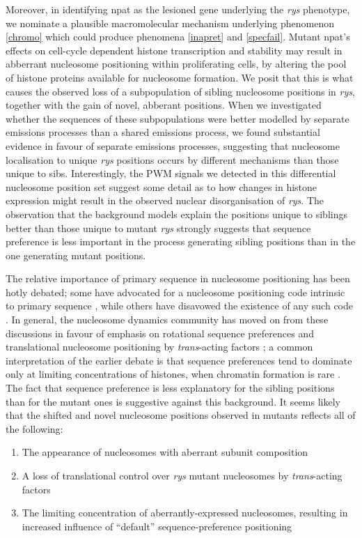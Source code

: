 Moreover, in identifying npat as the lesioned gene underlying the \textit{rys} phenotype, we nominate a plausible macromolecular mechanism underlying phenomenon \ref{chromo} which could produce phenomena \ref{inapret} and \ref{specfail}. Mutant npat's effects on cell-cycle dependent histone transcription and stability may result in abberrant nucleosome positioning within proliferating cells, by altering the pool of histone proteins available for nucleosome formation. We posit that this is what causes the observed loss of a subpopulation of sibling nucleosome positions in \textit{rys}, together with the gain of novel, abberant positions. When we investigated whether the sequences of these subpopulations were better modelled by separate emissions processes than a shared emissions process, we found substantial evidence in favour of separate emissions processes, suggesting that nucleosome localisation to unique \textit{rys} positions occurs by different mechanisms than those unique to sibs. Interestingly, the PWM signals we detected in this differential nucleosome position set suggest some detail as to how changes in histone expression might result in the observed nuclear disorganisation of \textit{rys}. The observation that the background models explain the positions unique to siblings better than those unique to mutant \textit{rys} strongly suggests that sequence preference is less important in the process generating sibling positions than in the one generating mutant positions.

The relative importance of primary sequence in nucleosome positioning has been hotly debated; some have advocated for a nucleosome positioning code intrinsic to primary sequence \cite{Kaplan2009}, while others have disavowed the existence of any such code \cite{Zhang2009}. In general, the nucleosome dynamics community has moved on from these discussions in favour of emphasis on rotational sequence preferences \cite{Tolstorukov2007} and translational nucleosome positioning by \textit{trans}-acting factors \cite{Klages-Mundt2018}; a common interpretation of the earlier debate is that sequence preferences tend to dominate only at limiting concentrations of histones, when chromatin formation is rare \cite{Pointner2013}. The fact that sequence preference is less explanatory for the sibling positions than for the mutant ones is suggestive against this background. It seems likely that the shifted and novel nucleosome positions observed in mutants reflects all of the following:

\begin{enumerate}
    \item The appearance of nucleosomes with aberrant subunit composition
    \item A loss of translational control over \textit{rys} mutant nucleosomes by \textit{trans}-acting factors
    \item The limiting concentration of aberrantly-expressed nucleosomes, resulting in increased influence of ``default'' sequence-preference positioning
\end{enumerate}

